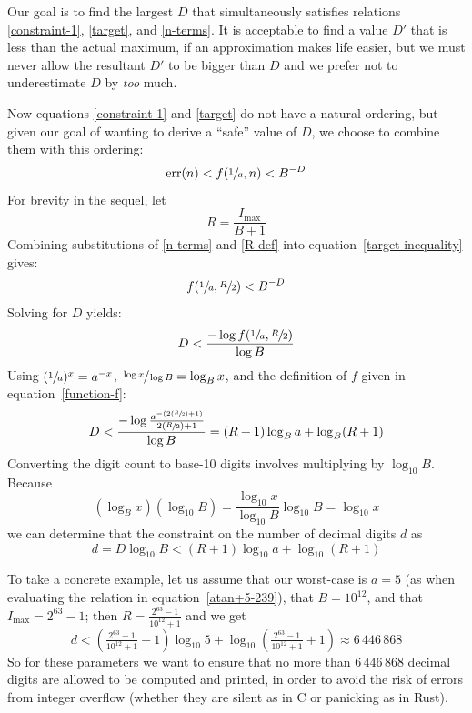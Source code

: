 \documentclass{report}
\newcommand{\vbreak}{\vspace{4ex}}
\newcommand{\vextra}{\vspace{2ex}}
\newcommand{\Imax}{\ensuremath{I_\text{max}}}
\DeclareMathOperator{\err}{err}
\begin{document}
\vbreak
Our goal is to find the largest $D$ that simultaneously satisfies
relations \eqref{constraint-1}, \eqref{target}, and \eqref{n-terms}.
It is acceptable to find a value $D'$
that is less than the actual maximum,
if an approximation makes life easier,
but we must never allow the resultant $D'$ to be bigger than $D$
and we prefer not to underestimate $D$ by \emph{too} much.

\vextra
Now equations \eqref{constraint-1} and \eqref{target}
do not have a natural ordering,
but given our goal of wanting to derive a ``safe'' value of $D$,
we choose to combine them with this ordering:
\begin{equation}\label{target-inequality}
  \err(n) < f(\sfrac{1}{a},n) < B^{-D}
\end{equation}
For brevity in the sequel, let
\begin{equation}\label{R-def}
  R = \frac{\Imax}{B+1}
\end{equation}
Combining substitutions of \eqref{n-terms} and \eqref{R-def}
into equation~\eqref{target-inequality} gives:
\begin{equation*}
  f(\sfrac{1}{a}, \sfrac{R}{2}) < B^{-D}
\end{equation*}
Solving for $D$ yields:
\begin{equation*}
  D < \frac{ -\log f(\sfrac{1}{a}, \sfrac{R}{2}) }{ \log B }
\end{equation*}
Using $(\sfrac{1}{a})^x = a^{-x}$,
$\sfrac{\log x}{\log B} = \log_B x$,
and the definition of $f$ given in equation~\eqref{function-f}:
\begin{equation}
  D
  < \frac{ -\log \frac{a^{-(2(\sfrac{R}{2})+1)}}{2(\sfrac{R}{2})+1} }{ \log B}
  = (R+1) \log_B a + \log_B (R+1)
\end{equation}
Converting the digit count to base-10 digits
involves multiplying by $\log_{10} B$.
Because
\begin{equation*}
  (\log_B x)(\log_{10} B)
  = \frac{\log_{10} x}{\log_{10} B} \log_{10} B
  = \log_{10} x
\end{equation*}
we can determine that the constraint on the number of decimal digits $d$ as
\begin{equation}\label{d-constraint}
  d = D \log_{10} B < (R+1) \log_{10} a + \log_{10}(R+1)
\end{equation}

\vbreak
To take a concrete example,
let us assume that our worst-case is $a=5$
(as when evaluating the relation in equation~\eqref{atan+5-239}),
that $B=10^{12}$,
and that $\Imax=2^{63}-1$;
then $R = \tfrac{2^{63}-1}{10^{12}+1}$
and we get
\begin{equation*}
  d
  < \left(\tfrac{2^{63}-1}{10^{12}+1} + 1\right) \log_{10} 5 + \log_{10} \left(\tfrac{2^{63}-1}{10^{12}+1} + 1\right)
  \approx 6\,446\,868
\end{equation*}
So for these parameters we want to ensure that no more than
$6\,446\,868$ decimal digits are allowed to be computed and printed,
in order to avoid the risk of errors from integer overflow
(whether they are silent as in C or panicking as in Rust).
\end{document}
